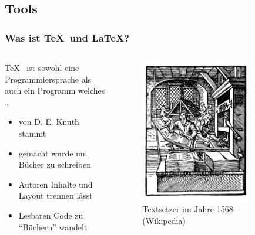 \subsection{Tools}
\begin{frame}
	\frametitle{Was ist \TeX~und \LaTeX?}
	\begin{columns}
		\begin{column}{5cm}
			\TeX~ ist sowohl eine Programmiersprache als auch 
			ein Programm welches \dots
			\begin{itemize}
				\item von D. E. Knuth stammt
				\item gemacht wurde um Bücher zu schreiben
				\item Autoren Inhalte und Layout trennen 
					lässt
				\item Lesbaren Code zu "`Büchern"' wandelt
			\end{itemize}
		\end{column}
		\begin{column}{5cm}
			\begin{figure}
				\centering
				\includegraphics[width=0.8\textwidth]{printer.png}
				\caption{Textsetzer im Jahre 1568 --- (Wikipedia) }
			\end{figure}
		\end{column}
	\end{columns}
\end{frame}

